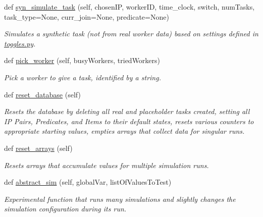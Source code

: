 \begin{DoxyCompactItemize}
def \hyperlink{classdynamicfilterapp_1_1test__simulations_1_1_simulation_test_adb57a1130669e13cca7754f0a6ea040f}{syn\+\_\+simulate\+\_\+task} (self, chosen\+IP, worker\+ID, time\+\_\+clock, switch, num\+Tasks, task\+\_\+type=None, curr\+\_\+join=None, predicate=None)
\begin{DoxyCompactList}\small\item\em Simulates a synthetic task (not from real worker data) based on settings defined in \hyperlink{toggles_8py}{toggles.\+py}. \end{DoxyCompactList}\item 
def \hyperlink{classdynamicfilterapp_1_1test__simulations_1_1_simulation_test_acb17139f8e2f7a4b835ec1c05400e8c2}{pick\+\_\+worker} (self, busy\+Workers, tried\+Workers)
\begin{DoxyCompactList}\small\item\em Pick a worker to give a task, identified by a string. \end{DoxyCompactList}\item 
def \hyperlink{classdynamicfilterapp_1_1test__simulations_1_1_simulation_test_a5af6b7d43daa54fef6fc6580683e5c80}{reset\+\_\+database} (self)
\begin{DoxyCompactList}\small\item\em Resets the database by deleting all real and placeholder tasks created, setting all IP Pairs, Predicates, and Items to their default states, resets various counters to appropriate starting values, empties arrays that collect data for singular runs. \end{DoxyCompactList}\item 
def \hyperlink{classdynamicfilterapp_1_1test__simulations_1_1_simulation_test_a7226eb6e9e46f40e7b99f22aade32edf}{reset\+\_\+arrays} (self)
\begin{DoxyCompactList}\small\item\em Resets arrays that accumulate values for multiple simulation runs. \end{DoxyCompactList}\item 
def \hyperlink{classdynamicfilterapp_1_1test__simulations_1_1_simulation_test_a1e7e4ad765387840293e282eaf2b20bf}{abstract\+\_\+sim} (self, global\+Var, list\+Of\+Values\+To\+Test)
\begin{DoxyCompactList}\small\item\em Experimental function that runs many simulations and slightly changes the simulation configuration during its run. \end{DoxyCompactList}\item 

\end{DoxyCompactItemize}
